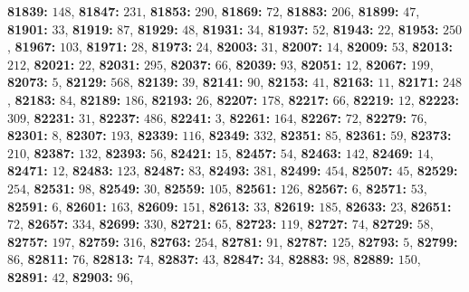\textsf{\bfseries 81839:} $148$, \textsf{\bfseries 81847:} $231$, \textsf{\bfseries 81853:} $290$, \textsf{\bfseries 81869:} $72$, \textsf{\bfseries 81883:} $206$, \textsf{\bfseries 81899:} $47$, \textsf{\bfseries 81901:} $33$, \textsf{\bfseries 81919:} $87$, \textsf{\bfseries 81929:} $48$, \textsf{\bfseries 81931:} $34$, \textsf{\bfseries 81937:} $52$, \textsf{\bfseries 81943:} $22$, \textsf{\bfseries 81953:} $250$, \textsf{\bfseries 81967:} $103$, \textsf{\bfseries 81971:} $28$, \textsf{\bfseries 81973:} $24$, \textsf{\bfseries 82003:} $31$, \textsf{\bfseries 82007:} $14$, \textsf{\bfseries 82009:} $53$, \textsf{\bfseries 82013:} $212$, \textsf{\bfseries 82021:} $22$, \textsf{\bfseries 82031:} $295$, \textsf{\bfseries 82037:} $66$, \textsf{\bfseries 82039:} $93$, \textsf{\bfseries 82051:} $12$, \textsf{\bfseries 82067:} $199$, \textsf{\bfseries 82073:} $5$, \textsf{\bfseries 82129:} $568$, \textsf{\bfseries 82139:} $39$, \textsf{\bfseries 82141:} $90$, \textsf{\bfseries 82153:} $41$, \textsf{\bfseries 82163:} $11$, \textsf{\bfseries 82171:} $248$, \textsf{\bfseries 82183:} $84$, \textsf{\bfseries 82189:} $186$, \textsf{\bfseries 82193:} $26$, \textsf{\bfseries 82207:} $178$, \textsf{\bfseries 82217:} $66$, \textsf{\bfseries 82219:} $12$, \textsf{\bfseries 82223:} $309$, \textsf{\bfseries 82231:} $31$, \textsf{\bfseries 82237:} $486$, \textsf{\bfseries 82241:} $3$, \textsf{\bfseries 82261:} $164$, \textsf{\bfseries 82267:} $72$, \textsf{\bfseries 82279:} $76$, \textsf{\bfseries 82301:} $8$, \textsf{\bfseries 82307:} $193$, \textsf{\bfseries 82339:} $116$, \textsf{\bfseries 82349:} $332$, \textsf{\bfseries 82351:} $85$, \textsf{\bfseries 82361:} $59$, \textsf{\bfseries 82373:} $210$, \textsf{\bfseries 82387:} $132$, \textsf{\bfseries 82393:} $56$, \textsf{\bfseries 82421:} $15$, \textsf{\bfseries 82457:} $54$, \textsf{\bfseries 82463:} $142$, \textsf{\bfseries 82469:} $14$, \textsf{\bfseries 82471:} $12$, \textsf{\bfseries 82483:} $123$, \textsf{\bfseries 82487:} $83$, \textsf{\bfseries 82493:} $381$, \textsf{\bfseries 82499:} $454$, \textsf{\bfseries 82507:} $45$, \textsf{\bfseries 82529:} $254$, \textsf{\bfseries 82531:} $98$, \textsf{\bfseries 82549:} $30$, \textsf{\bfseries 82559:} $105$, \textsf{\bfseries 82561:} $126$, \textsf{\bfseries 82567:} $6$, \textsf{\bfseries 82571:} $53$, \textsf{\bfseries 82591:} $6$, \textsf{\bfseries 82601:} $163$, \textsf{\bfseries 82609:} $151$, \textsf{\bfseries 82613:} $33$, \textsf{\bfseries 82619:} $185$, \textsf{\bfseries 82633:} $23$, \textsf{\bfseries 82651:} $72$, \textsf{\bfseries 82657:} $334$, \textsf{\bfseries 82699:} $330$, \textsf{\bfseries 82721:} $65$, \textsf{\bfseries 82723:} $119$, \textsf{\bfseries 82727:} $74$, \textsf{\bfseries 82729:} $58$, \textsf{\bfseries 82757:} $197$, \textsf{\bfseries 82759:} $316$, \textsf{\bfseries 82763:} $254$, \textsf{\bfseries 82781:} $91$, \textsf{\bfseries 82787:} $125$, \textsf{\bfseries 82793:} $5$, \textsf{\bfseries 82799:} $86$, \textsf{\bfseries 82811:} $76$, \textsf{\bfseries 82813:} $74$, \textsf{\bfseries 82837:} $43$, \textsf{\bfseries 82847:} $34$, \textsf{\bfseries 82883:} $98$, \textsf{\bfseries 82889:} $150$, \textsf{\bfseries 82891:} $42$, \textsf{\bfseries 82903:} $96$, 
